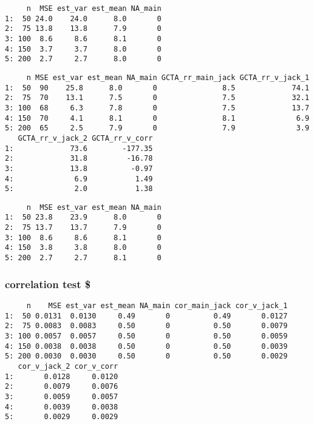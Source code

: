 \documentclass[]{article}
\begin{document}
\begin{verbatim}
     n  MSE est_var est_mean NA_main
1:  50 24.0    24.0      8.0       0
2:  75 13.8    13.8      7.9       0
3: 100  8.6     8.6      8.1       0
4: 150  3.7     3.7      8.0       0
5: 200  2.7     2.7      8.0       0
\end{verbatim}

\begin{verbatim}
     n MSE est_var est_mean NA_main GCTA_rr_main_jack GCTA_rr_v_jack_1
1:  50  90    25.8      8.0       0               8.5             74.1
2:  75  70    13.1      7.5       0               7.5             32.1
3: 100  68     6.3      7.8       0               7.5             13.7
4: 150  70     4.1      8.1       0               8.1              6.9
5: 200  65     2.5      7.9       0               7.9              3.9
   GCTA_rr_v_jack_2 GCTA_rr_v_corr
1:             73.6        -177.35
2:             31.8         -16.78
3:             13.8          -0.97
4:              6.9           1.49
5:              2.0           1.38
\end{verbatim}

\begin{verbatim}
     n  MSE est_var est_mean NA_main
1:  50 23.8    23.9      8.0       0
2:  75 13.7    13.7      7.9       0
3: 100  8.6     8.6      8.1       0
4: 150  3.8     3.8      8.0       0
5: 200  2.7     2.7      8.1       0
\end{verbatim}

\subsubsection{correlation test \$}\label{correlation-test}

\begin{verbatim}
     n    MSE est_var est_mean NA_main cor_main_jack cor_v_jack_1
1:  50 0.0131  0.0130     0.49       0          0.49       0.0127
2:  75 0.0083  0.0083     0.50       0          0.50       0.0079
3: 100 0.0057  0.0057     0.50       0          0.50       0.0059
4: 150 0.0038  0.0038     0.50       0          0.50       0.0039
5: 200 0.0030  0.0030     0.50       0          0.50       0.0029
   cor_v_jack_2 cor_v_corr
1:       0.0128     0.0120
2:       0.0079     0.0076
3:       0.0059     0.0057
4:       0.0039     0.0038
5:       0.0029     0.0029
\end{verbatim}
\end{document}
